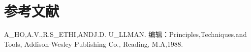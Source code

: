 \section*{参考文献}
\begin{thebibliography}
     A\_{HO},A.V.,R.S\_{ETHI,AND}J.D. U\_{LLMAN}. 编辑：Principles,Techniques,and Tools, Addison-Wesley Publishing Co., Reading, M.A,1988.


\end{thebibliography}
